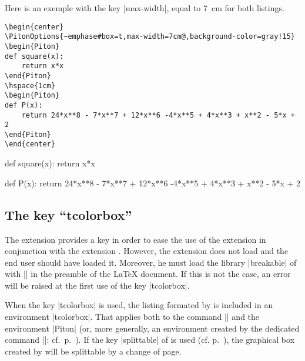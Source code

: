 \documentclass{article}
\begin{document}
\vspace{1cm}
Here is an exemple with the key |max-width|, equal to 7~cm for both listings.

\begin{Verbatim}
\begin{center}
\PitonOptions{~emphase#box=t,max-width=7cm@,background-color=gray!15}
\begin{Piton}
def square(x):
    return x*x
\end{Piton}
\hspace{1cm}
\begin{Piton}
def P(x):
    return 24*x**8 - 7*x**7 + 12*x**6 -4*x**5 + 4*x**3 + x**2 - 5*x + 2
\end{Piton}
\end{center}
\end{Verbatim}

\begin{center}
\begin{Piton}
def square(x):
    return x*x
\end{Piton}
\hspace{1cm}
\begin{Piton}
def P(x):
    return 24*x**8 - 7*x**7 + 12*x**6 -4*x**5 + 4*x**3 + x**2 - 5*x + 2
\end{Piton}
\end{center}

\subsection{The key ``tcolorbox''}

\label{tcolorbox}

The extension  provides a key  in order to
ease the use of the extension  in conjunction with the extension
. However, the extension  does not load  and
the end user should have loaded it. Moreover, he must load the library |breakable|
of  with || in the preamble of the LaTeX document.
If this is not the case, an error will be raised at the first use of the key
|tcolorbox|.

\bigskip
When the key |tcolorbox| is used, the listing formated by  is
included in an environment |{tcolorbox}|. That applies both to the command
|\PitonInputFile| and the environment |{Piton}| (or, more generally, an
environment created by the dedicated command |\NewPitonEnvironment|:
cf.~p.~\pageref{NewPitonEnvironment}). If the key |splittable| of 
is used (cf. p.~\pageref{page breaks}), the graphical box created by
 will be splittable by a change of page.
\end{document}
